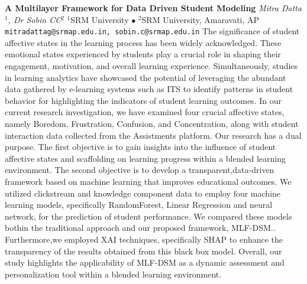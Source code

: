
    \begin{conf-abstract}[]
        {\textbf{A Multilayer Framework for Data Driven Student Modeling}}
        {\textit{Mitra  Datta$^{1}$, Dr Sobin CC$^{2}$}}
        {$^{1}$SRM University $\bullet$ $^{2}$SRM University, Amaravati, AP}
        {\texttt{mitradattag@srmap.edu.in, sobin.c@srmap.edu.in}}
        {The significance of student affective states in the learning process has been widely acknowledged. These emotional states experienced by students play a crucial role in shaping their engagement, motivation, and overall learning experience. Simultaneously, studies in learning analytics have showcased the potential of leveraging the abundant data gathered by e-learning systems such as ITS to identify patterns in student behavior for highlighting the indicators of student learning outcomes. In our current research investigation, we have examined four crucial affective states, namely Boredom, Frustration, Confusion, and Concentration, along with student interaction data collected from the Assistments platform. Our research has a dual purpose. The first objective is to gain insights into the influence of student affective states and scaffolding on learning progress within a blended learning environment. The second objective is to develop a transparent,data-driven framework based on machine learning that improves educational outcomes. We utilized clickstream and knowledge component data to employ four machine learning models, specifically RandomForest, Linear Regression and neural network, for the prediction of student performance. We compared these models bothin the traditional approach and our proposed framework, MLF-DSM.. Furthermore,we employed XAI techniques, specifically SHAP to enhance the transparency of the results obtained from this black box model. Overall, our study highlights the applicability of MLF-DSM as a dynamic assessment and personalization tool within a blended learning environment.}
    \end{conf-abstract}
        